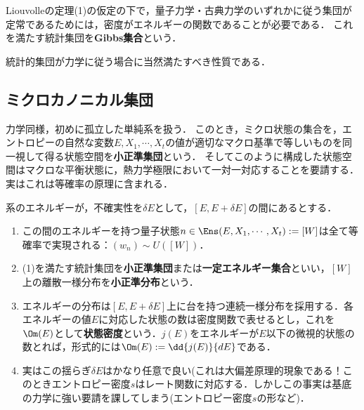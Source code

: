 \documentclass[uplatex,dvipdfmx]{jsreport}
\begin{document}
\begin{proposition}
    Liouvolleの定理(1)の仮定の下で，量子力学・古典力学のいずれかに従う集団が定常であるためには，密度がエネルギーの関数であることが必要である．
    これを満たす統計集団を\textbf{Gibbs集合}という．
\end{proposition}
\begin{remarks}
    統計的集団が力学に従う場合に当然満たすべき性質である．
\end{remarks}

\subsection{ミクロカノニカル集団}

\begin{tcolorbox}[colframe=ForestGreen, colback=ForestGreen!10!white,breakable,colbacktitle=ForestGreen!40!white,coltitle=black,fonttitle=\bfseries\sffamily,
title=]
    力学同様，初めに孤立した単純系を扱う．
    このとき，ミクロ状態の集合を，エントロピーの自然な変数$E,X_1,\cdots,X_t$の値が適切なマクロ基準で等しいものを同一視して得る状態空間を\textbf{小正準集団}という．
    そしてこのように構成した状態空間はマクロな平衡状態に，熱力学極限において一対一対応することを要請する．
    実はこれは等確率の原理に含まれる．
\end{tcolorbox}

\begin{model}
    系のエネルギーが，不確実性を$\delta E$として，$[E,E+\delta E]$の間にあるとする．
    \begin{enumerate}
        \item この間のエネルギーを持つ量子状態$n\in \Ens(E,X_1,\cdots,X_t):=[W]$は全て等確率で実現される：$(w_n)\sim U([W])$．
        \item (1)を満たす統計集団を\textbf{小正準集団}または\textbf{一定エネルギー集合}といい，$[W]$上の離散一様分布を\textbf{小正準分布}という．
        \item エネルギーの分布は$[E,E+\delta E]$上に台を持つ連続一様分布を採用する．各エネルギーの値$E$に対応した状態の数は密度関数で表せるとし，これを$\Om(E)$として\textbf{状態密度}という．$j(E)$をエネルギーが$E$以下の微視的状態の数とれば，形式的には$\Om(E):=\dd{j(E)}{dE}$である．
        \item 実はこの揺らぎ$\delta E$はかなり任意で良い(これは大偏差原理的現象である！このときエントロピー密度$s$はレート関数に対応する．しかしこの事実は基底の力学に強い要請を課してしまう(エントロピー密度$s$の形など)．
    \end{enumerate}
\end{model}
\end{document}
